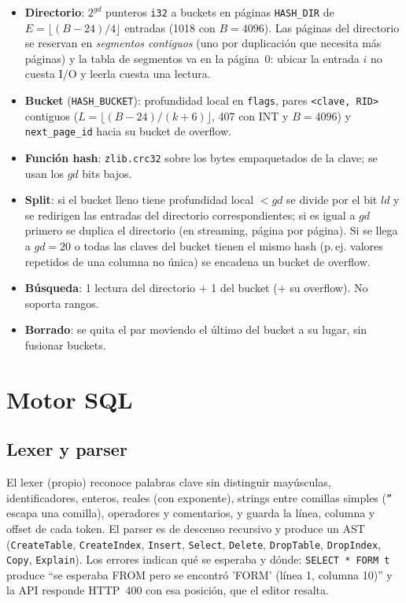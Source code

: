 \documentclass[11pt,a4paper]{article}
\newcommand{\code}[1]{\texttt{#1}}
\begin{document}
\begin{itemize}
\item \textbf{Directorio}: $2^{gd}$ punteros \code{i32} a buckets en páginas \code{HASH\_DIR} de
  $E=\lfloor (B-24)/4\rfloor$ entradas (1018 con $B=4096$). Las páginas del directorio se reservan en
  \emph{segmentos contiguos} (uno por duplicación que necesita más páginas) y la tabla de segmentos va
  en la página~0: ubicar la entrada $i$ no cuesta I/O y leerla cuesta una lectura.
\item \textbf{Bucket} (\code{HASH\_BUCKET}): profundidad local en \code{flags}, pares
  \code{<clave, RID>} contiguos ($L=\lfloor (B-24)/(k+6)\rfloor$, 407 con INT y $B=4096$) y
  \code{next\_page\_id} hacia su bucket de overflow.
\item \textbf{Función hash}: \code{zlib.crc32} sobre los bytes empaquetados de la clave; se usan los
  $gd$ bits bajos.
\item \textbf{Split}: si el bucket lleno tiene profundidad local $< gd$ se divide por el bit $ld$ y se
  redirigen las entradas del directorio correspondientes; si es igual a $gd$ primero se duplica el
  directorio (en streaming, página por página). Si se llega a $gd=20$ o todas las claves del bucket
  tienen el mismo hash (p.\,ej. valores repetidos de una columna no única) se encadena un bucket de
  overflow.
\item \textbf{Búsqueda}: 1 lectura del directorio + 1 del bucket (+ su overflow). No soporta rangos.
\item \textbf{Borrado}: se quita el par moviendo el último del bucket a su lugar, sin fusionar buckets.
\end{itemize}

\section{Motor SQL}

\subsection{Lexer y parser}

El lexer (propio) reconoce palabras clave sin distinguir mayúsculas, identificadores, enteros,
reales (con exponente), strings entre comillas simples (\code{''} escapa una comilla), operadores y
comentarios, y guarda la línea, columna y offset de cada token. El parser es de descenso recursivo y
produce un AST (\code{CreateTable}, \code{CreateIndex}, \code{Insert}, \code{Select}, \code{Delete},
\code{DropTable}, \code{DropIndex}, \code{Copy}, \code{Explain}). Los errores indican qué se esperaba y
dónde: \code{SELECT * FORM t} produce ``se esperaba FROM pero se encontró 'FORM'
(línea 1, columna 10)'' y la API responde HTTP~400 con esa posición, que el editor resalta.
\end{document}
